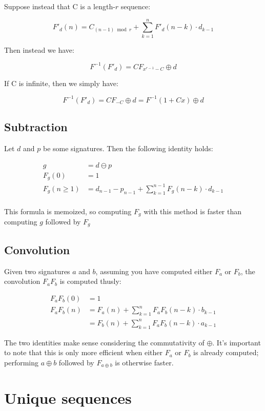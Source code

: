 \documentclass{article}
\begin{document}
\noindent Suppose instead that C is a length-$r$ sequence:

$$F'_d (n) = C_{(n-1) \bmod r} + \sum_{k=1}^{n} F'_d (n-k) \cdot d_{k-1}$$

\noindent Then instead we have:

$$F^{-1}(F'_d) = CF_{x^{r-1} - C} \oplus d$$

\noindent If C is infinite, then we simply have:

$$F^{-1}(F'_d) = CF_{-C} \oplus d = F^{-1} (1 + Cx) \oplus d$$

\subsection{Subtraction}

Let $d$ and $p$ be some signatures. Then the following identity holds:

\begin{align*}
g &= d \ominus p\\
F_g(0) &= 1\\
F_g(n \geq 1) &= d_{n-1} - p_{n-1} + \sum_{k=1}^{n-1} F_g(n-k) \cdot d_{k-1}\\
\end{align*}

\noindent This formula is memoized, so computing $F_g$ with this method is faster than computing $g$ followed by $F_g$\\

\subsection{Convolution}

Given two signatures $a$ and $b$, assuming you have computed either $F_a$ or $F_b$, the convolution $F_a F_b$ is computed thusly:

\begin{align*}
F_a F_b (0) &= 1\\
F_a F_b (n) &= F_a(n) + \sum_{k=1}^{n} F_a F_b (n-k) \cdot b_{k-1}\\
&= F_b(n) + \sum_{k=1}^{n} F_a F_b (n-k) \cdot a_{k-1}
\end{align*}

\noindent The two identities make sense considering the commutativity of $\oplus$. It's important to note that this is only more efficient when either $F_a$ or $F_b$ is already computed; performing $a \oplus b$ followed by $F_{a \oplus b}$ is otherwise faster.

\section{Unique sequences}
\end{document}
